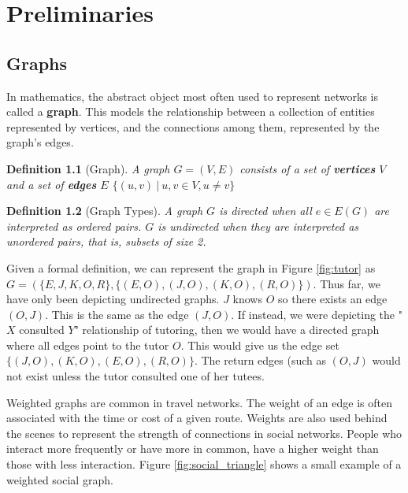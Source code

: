 \documentclass[12pt,twoside]{reedthesis}
\newtheorem{definition}{Definition} %
\begin{document}
		\chapter{Preliminaries}

\section{Graphs}

In mathematics, the abstract object most often used to represent networks is called a \textbf{graph}. This models the relationship between a collection of entities represented by vertices, and the connections among them, represented by the graph's edges.

\begin{definition} [Graph]
\label{def:graph}
A graph $G = (V,E)$ consists of a set of \textbf{vertices} $V$ and a set of \textbf{edges} $E$ $\{ (u,v)  \ | \ u,v \in V, u \neq v\}$

\end{definition}

\begin{definition} [Graph Types]
\label{def:graph_types}
A graph $G$ is \textit{directed} when all $e \in E(G)$ are interpreted as ordered pairs. $G$ is undirected when they are interpreted as unordered pairs, that is, subsets of size 2.
\end{definition}

Given a formal definition, we can represent the graph in Figure \ref{fig:tutor} as $G = (\{E,J,K,O,R\}, \{(E,O), (J,O), (K,O), (R,O)\})$. Thus far, we have only been depicting undirected graphs. $J$ knows $O$ so there exists an edge $(O,J)$. This is the same as the edge $(J,O)$. If instead, we were depicting the "$X$ consulted $Y$" relationship of tutoring, then we would have a directed graph where all edges point to the tutor $O$. This would give us the edge set $\{ (J,O), (K,O), (E,O),(R,O) \}$. The return edges (such as $(O,J)$ would not exist unless the tutor consulted one of her tutees.

Weighted graphs are common in travel networks. The weight of an edge is often associated with the time or cost of a given route. Weights are also used behind the scenes to represent the strength of connections in social networks. People who interact more frequently or have more in common, have a higher weight than those with less interaction. Figure \ref{fig:social_triangle} shows a small example of a weighted social graph.
\end{document}
